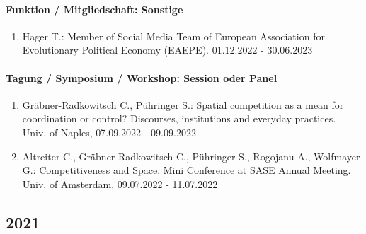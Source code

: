 \paragraph{Funktion / Mitgliedschaft: Sonstige} 
\begin{enumerate}[leftmargin=*, labelsep=0.5cm] 
 	 \item Hager T.: Member of Social Media Team of European Association for Evolutionary Political Economy (EAEPE). 01.12.2022 - 30.06.2023 
\end{enumerate} 
\paragraph{Tagung / Symposium / Workshop: Session oder Panel} 
\begin{enumerate}[leftmargin=*, labelsep=0.5cm] 
 	 \item Gräbner-Radkowitsch C., Pühringer S.: Spatial competition as a mean for coordination or control? Discourses, institutions and everyday practices. Univ. of Naples, 07.09.2022 - 09.09.2022 
	 \item Altreiter C., Gräbner-Radkowitsch C., Pühringer S., Rogojanu A., Wolfmayer G.: Competitiveness and Space. Mini Conference at SASE Annual Meeting. Univ. of Amsterdam, 09.07.2022 - 11.07.2022 
\end{enumerate} 
\subsection*{2021} 
